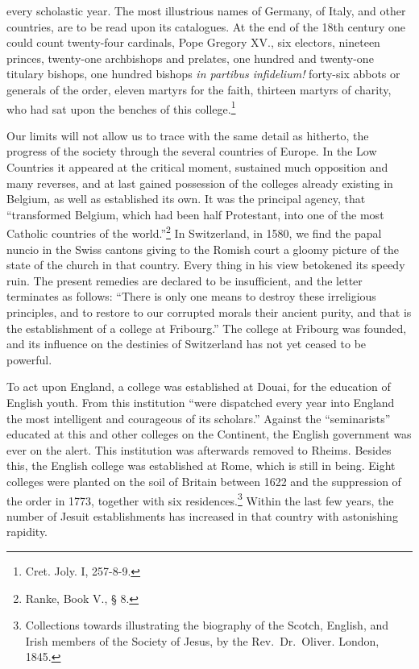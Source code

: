 \documentclass[]{book}
\let\rmarkdownfootnote\footnote%
\def\footnote{\protect\rmarkdownfootnote}
\begin{document}
every scholastic year. The most illustrious names of Germany, of Italy, and other countries, are to be read upon its catalogues. At the end of the 18th century one could count twenty-four cardinals, Pope Gregory XV., six electors, nineteen princes, twenty-one archbishops and prelates, one hundred and twenty-one titulary bishops, one hundred bishops \emph{in partibus infidelium!} forty-six abbots or generals of the order, eleven martyrs for the faith, thirteen martyrs of charity, who had sat upon the benches of this college.\footnote{Cret. Joly. I, 257-8-9.}

Our limits will not allow us to trace with the same detail as hitherto, the progress of the society through the several countries of Europe. In the Low Countries it appeared at the critical moment, sustained much opposition and many reverses, and at last gained possession of the colleges already existing in Belgium, as well as established its own. It was the principal agency, that ``transformed Belgium, which had been half Protestant, into one of the most Catholic countries of the world.''\footnote{Ranke, Book V., § 8.} In Switzerland, in 1580, we find the papal nuncio in the Swiss cantons giving to the Romish court a gloomy picture of the state of the church in that country. Every thing in his view betokened its speedy ruin. The present remedies are declared to be insufficient, and the letter terminates as follows: ``There is only one means to destroy these irreligious principles, and to restore to our corrupted morals their ancient purity, and that is the establishment of a college at Fribourg.'' The college at Fribourg was founded, and its influence on the destinies of Switzerland has not yet ceased to be powerful.

To act upon England, a college was established at Douai, for the education of English youth. From this institution ``were dispatched every year into England the most intelligent and courageous of its scholars.'' Against the ``seminarists'' educated at this and other colleges on the Continent, the English government was ever on the alert. This institution was afterwards removed to Rheims. Besides this, the English college was established at Rome, which is still in being. Eight colleges were planted on the soil of Britain between 1622 and the suppression of the order in 1773, together with six residences.\footnote{Collections towards illustrating the biography of the Scotch, English, and Irish members of the Society of Jesus, by the Rev.~Dr.~Oliver. London, 1845.} Within the last few years, the number of Jesuit establishments has increased in that country with astonishing rapidity.
\end{document}

